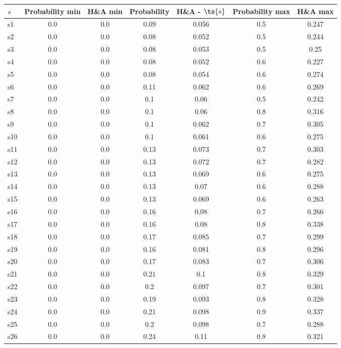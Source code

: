 \documentclass{article}
\begin{document}
\noindent\begin{tabular}{|l|c|c|c|c|c|c|}
\hline
$s$& Probability min & H\&A min & Probability & H\&A - $\ts{s}$ & Probability max & H\&A max\\
\hline
s1 &0.0 & 0.0 & 0.09 & 0.056 & 0.5 & 0.247\\
\hline
s2 &0.0 & 0.0 & 0.08 & 0.052 & 0.5 & 0.244\\
\hline
s3 &0.0 & 0.0 & 0.08 & 0.053 & 0.5 & 0.25\\
\hline
s4 &0.0 & 0.0 & 0.08 & 0.052 & 0.6 & 0.227\\
\hline
s5 &0.0 & 0.0 & 0.08 & 0.054 & 0.6 & 0.274\\
\hline
s6 &0.0 & 0.0 & 0.11 & 0.062 & 0.6 & 0.269\\
\hline
s7 &0.0 & 0.0 & 0.1 & 0.06 & 0.5 & 0.242\\
\hline
s8 &0.0 & 0.0 & 0.1 & 0.06 & 0.8 & 0.316\\
\hline
s9 &0.0 & 0.0 & 0.1 & 0.062 & 0.7 & 0.305\\
\hline
s10 &0.0 & 0.0 & 0.1 & 0.061 & 0.6 & 0.275\\
\hline
s11 &0.0 & 0.0 & 0.13 & 0.073 & 0.7 & 0.303\\
\hline
s12 &0.0 & 0.0 & 0.13 & 0.072 & 0.7 & 0.282\\
\hline
s13 &0.0 & 0.0 & 0.13 & 0.069 & 0.6 & 0.275\\
\hline
s14 &0.0 & 0.0 & 0.13 & 0.07 & 0.6 & 0.288\\
\hline
s15 &0.0 & 0.0 & 0.13 & 0.069 & 0.6 & 0.263\\
\hline
s16 &0.0 & 0.0 & 0.16 & 0.08 & 0.7 & 0.266\\
\hline
s17 &0.0 & 0.0 & 0.16 & 0.08 & 0.8 & 0.338\\
\hline
s18 &0.0 & 0.0 & 0.17 & 0.085 & 0.7 & 0.299\\
\hline
s19 &0.0 & 0.0 & 0.16 & 0.081 & 0.8 & 0.296\\
\hline
s20 &0.0 & 0.0 & 0.17 & 0.083 & 0.7 & 0.306\\
\hline
s21 &0.0 & 0.0 & 0.21 & 0.1 & 0.8 & 0.329\\
\hline
s22 &0.0 & 0.0 & 0.2 & 0.097 & 0.7 & 0.301\\
\hline
s23 &0.0 & 0.0 & 0.19 & 0.093 & 0.8 & 0.328\\
\hline
s24 &0.0 & 0.0 & 0.21 & 0.098 & 0.9 & 0.337\\
\hline
s25 &0.0 & 0.0 & 0.2 & 0.098 & 0.7 & 0.288\\
\hline
s26 &0.0 & 0.0 & 0.24 & 0.11 & 0.8 & 0.321\\

\end{tabular}
\end{document}
